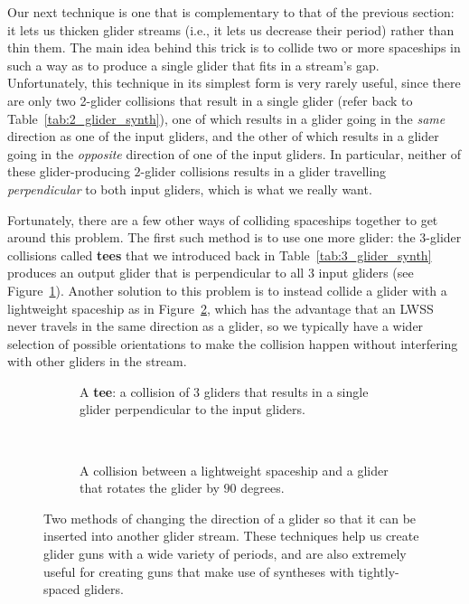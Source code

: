 Our next technique is one that is complementary to that of the previous section: it lets us thicken glider streams (i.e., it lets us decrease their period) rather than thin them. The main idea behind this trick is to collide two or more spaceships in such a way as to produce a single glider that fits in a stream's gap. Unfortunately, this technique in its simplest form is very rarely useful, since there are only two 2-glider collisions that result in a single glider (refer back to Table~\ref{tab:2_glider_synth}), one of which results in a glider going in the \emph{same} direction as one of the input gliders, and the other of which results in a glider going in the \emph{opposite} direction of one of the input gliders. In particular, neither of these glider-producing $2$-glider collisions results in a glider travelling \emph{perpendicular} to both input gliders, which is what we really want.

Fortunately, there are a few other ways of colliding spaceships together to get around this problem. The first such method is to use one more glider: the $3$-glider collisions called \textbf{tees} that we introduced back in Table~\ref{tab:3_glider_synth} produces an output glider that is perpendicular to all $3$ input gliders (see Figure~\ref{fig:tee}). Another solution to this problem is to instead collide a glider with a lightweight spaceship as in Figure~\ref{fig:lwss_reflect_glider}, which has the advantage that an LWSS never travels in the same direction as a glider, so we typically have a wider selection of possible orientations to make the collision happen without interfering with other gliders in the stream.

\begin{figure}[!htb]
	\centering
	\begin{subfigure}{.48\textwidth}
		\centering
		\caption{A \textbf{tee}: a collision of $3$ gliders that results in a single glider perpendicular to the input gliders.}
		\label{fig:tee}
	\end{subfigure} \ \ \ \ %
	\begin{subfigure}{.48\textwidth}
		\centering
		\caption{A collision between a lightweight spaceship and a glider that rotates the glider by $90$ degrees.}
		\label{fig:lwss_reflect_glider}
	\end{subfigure}
	\caption{Two methods of changing the direction of a glider so that it can be inserted into another glider stream. These techniques help us create glider guns with a wide variety of periods, and are also extremely useful for creating guns that make use of syntheses with tightly-spaced gliders.}\label{fig:glider_insert_methods}
\end{figure}

